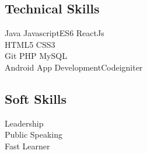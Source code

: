 \documentclass[]{deedy-resume-openfont}
\begin{document}
\begin{minipage}[t]{0.49\textwidth}
\subsection{Technical Skills}
\textbullet{} Java\textbullet{} Javascript{ES6}\textbullet{} ReactJs\\ \textbullet{} HTML5\textbullet{} CSS3 \\
\textbullet{} Git\textbullet{} PHP \textbullet{} MySQL\\
\textbullet{}Android App Development\textbullet{}Codeigniter\\
\sectionsep

\subsection{Soft Skills}
\textbullet{} Leadership \\
 \textbullet{} Public Speaking\\
 \textbullet{} Fast Learner
\sectionsep



%
%

\end{minipage} 
\hfill
\end{document}
